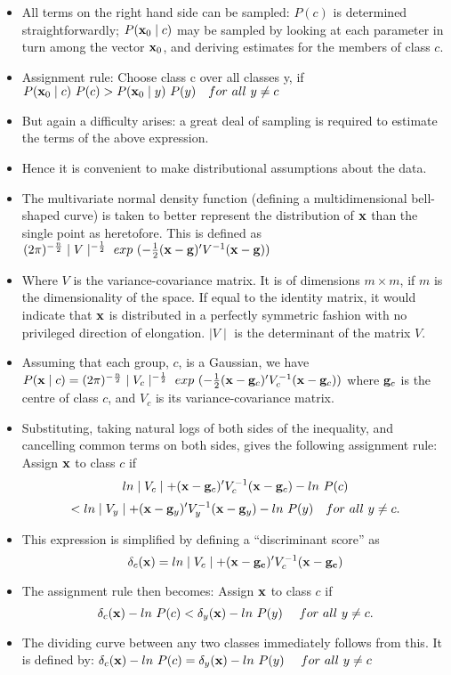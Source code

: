 \documentclass[a4,dvips]{seminar}
\begin{document}
\begin{slide}
\begin{itemize}
\item All terms on the right hand side can be sampled: $P(c)$ is determined
straightforwardly; $P({\bf x}_0 \mid c)$ may be sampled by looking
at each parameter in turn among the vector ${\bf x}_0$, and deriving
estimates for the members of class $c$.
\item Assignment rule:  Choose class c over all classes y, if
$ P({\bf x}_0 \mid c) \ P(c) > P({\bf x}_0 \mid y) \ P(y) \ \ \
                                       for \  all \  y \neq c $
\item But again a
difficulty arises: a great deal of sampling is required to estimate the
terms of the above expression.
\item Hence it is convenient to make distributional
assumptions about the data.
\item The multivariate normal density function (defining a multidimensional
bell-shaped curve) is taken to better represent the distribution of
${\bf x}$ than the single point as heretofore.  This is defined as
$ (2 \pi)^{-{n \over 2}} \mid V \mid ^{-{1 \over 2}} \ exp \ 
   (-{1 \over 2} ({\bf x} - {\bf g})^\prime V^{-1} ({\bf x} - {\bf g}))
$ 
\item Where
$V$ is the variance-covariance matrix.  It is of dimensions 
$m \times m$, if $m$ is the dimensionality of the space.  If equal to the
identity matrix, it would indicate that ${\bf x}$ is distributed in a
perfectly symmetric fashion with no privileged direction of elongation.
$\mid V \mid$ is the determinant of the matrix $V$.
\item Assuming that each group, $c$, is a Gaussian, we have
$ P({\bf x} \mid c) = (2 \pi)^{-{n \over 2}} \mid V_c \mid ^{-{1 \over 2}} 
   \ exp \ 
   (-{1 \over 2} ({\bf x} - {\bf g}_c)^\prime V^{-1}_c ({\bf x} - {\bf g}_c))
$ where
${\bf g}_c$ is the centre of class $c$, and $V_c$ is its 
variance-covariance matrix.
\item Substituting, taking natural logs of both sides of
the inequality, and cancelling common terms on both sides, gives the
following assignment rule: Assign ${\bf x}$ to class $c$ if
$$ ln \mid V_c \mid + ({\bf x} - {\bf g}_c)^\prime V^{-1}_c ({\bf x} 
- {\bf g}_c)  - ln \ P(c)   $$
$$  <  ln \mid V_y \mid + ({\bf x} - {\bf g}_y)^\prime V^{-1}_y 
({\bf x} - {\bf g}_y)
 - ln \ P(y) \ \ \ for \ all \ y \neq c .
$$
\item This expression is simplified by defining a ``discriminant score'' as
$$ \delta_c({\bf x}) = ln \mid V_c \mid + 
({\bf x} - {\bf g_c})^\prime V^{-1}_c ({\bf x} - {\bf g_c})  $$
\item The assignment rule then becomes: Assign ${\bf x}$ to class $c$
if
$$ \delta_c({\bf x}) - ln \ P(c) < \delta_y({\bf x}) - ln \ P(y) 
 \   \ \ \ for \ all \ y \neq c . $$
\item The dividing curve between any two classes immediately follows from
this.  It is defined by:
$ \delta_c({\bf x}) - ln \ P(c) = \delta_y({\bf x}) - ln \ P(y) 
 \   \ \ \ for \ all \ y \neq c $


\end{itemize}
\end{slide}
\end{document}

